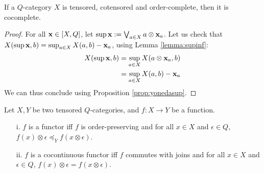 \begin{proposition}\label{prop:tencoten}
If a $Q$-category $X$ is tensored, cotensored and order-complete, then it is cocomplete.
\end{proposition}
\begin{proof}
For all $\mathbf{x}\in [X,Q]$, let $\sup \mathbf{x}:= \bigvee_{a\in X}a\otimes\mathbf{x}_{a}$. 
Let us check that $X(\sup \mathbf{x}, b)= \sup_{a\in X}X(a,b)-\mathbf{x}_{a}$, using Lemma \ref{lemma:supinf}:
\begin{align*}
X(\sup \mathbf{x}, b) &= \sup_{a\in X}X(a\otimes \mathbf{x}_{a},b)\\
&=\sup_{a\in X}X(a,b)-\mathbf{x}_{a}
\end{align*}
We can thus conclude using Proposition \ref{prop:yonedasup}.
\end{proof}

\begin{proposition}\label{prop:tenfun}
Let $X,Y$ be two tensored $Q$-categories, and $f:X\to Y$ be a function.
\begin{itemize}
\item[i.] $f$ is a functor iff $f$ is order-preserving and for all $x\in X$ and $\epsilon\in Q$, $f(x)\otimes \epsilon \preceq_{Y} f(x\otimes \epsilon)$.

\item[ii.] $f$ is a cocontinuous functor iff $f$ commutes with joins and for all $x\in X$ and $\epsilon\in Q$, $f(x)\otimes \epsilon = f(x\otimes \epsilon)$.
\end{itemize}
\end{proposition}
